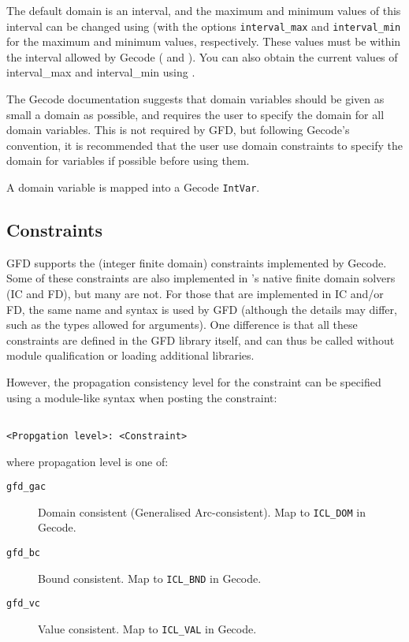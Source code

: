 The default domain is an interval, and the maximum and minimum values of this
interval can be changed using  (with the options 
{\tt interval_max} and {\tt interval_min} for the maximum and minimum values,
respectively. These values must be within the interval allowed by Gecode
( and ). You can also obtain the current values
of interval_max and interval_min using .

The Gecode documentation suggests that domain variables should be given as
small a domain as possible, and requires the user to specify the domain for 
all domain variables. This is not required by GFD, but following Gecode's
convention, it is recommended that the user use domain constraints to specify 
the domain for variables if possible before using them.

A domain variable is mapped into a Gecode \verb'IntVar'.


\subsection{Constraints}

GFD supports the (integer finite domain) constraints implemented by Gecode.
Some of these constraints are also implemented in \eclipse's native finite 
domain solvers (IC and FD), but many are not. For those that are 
implemented in IC and/or FD, the same name and syntax is used by GFD 
(although the details may differ, such as the types allowed for arguments).  
One difference is that all these constraints are defined in the GFD
library itself, and can thus be called without module qualification or
loading additional libraries. 

However, the propagation consistency level for the constraint can be 
specified using a module-like syntax when posting the constraint:

\begin{verbatim}

<Propgation level>: <Constraint>

\end{verbatim}

where propagation level is one of:

\begin{description}
\item[{\tt gfd_gac}] Domain consistent (Generalised Arc-consistent). Map to {\tt ICL_DOM} in Gecode.
\item[{\tt gfd_bc}] Bound consistent. Map to {\tt ICL_BND} in Gecode.
\item[{\tt gfd_vc}] Value consistent. Map to {\tt ICL_VAL} in Gecode.
\end{description}


